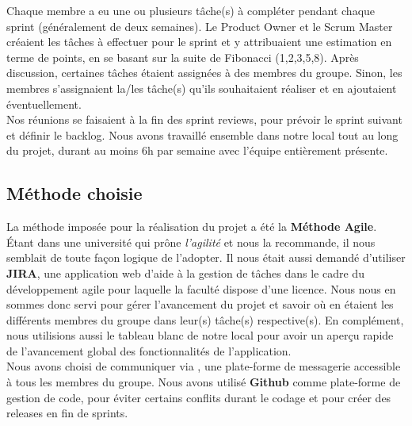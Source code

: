 \documentclass[t, 12pt, usenames,dvipsnames]{article}
\begin{document}
            \newpage
            
            \noindent Chaque membre a eu une ou plusieurs tâche(s) à compléter pendant chaque sprint (généralement de deux semaines). Le Product Owner et le Scrum Master créaient les tâches à effectuer pour le sprint et y attribuaient une estimation en terme de points, en se basant sur la suite de Fibonacci (1,2,3,5,8). Après discussion, certaines tâches étaient assignées à des membres du groupe. Sinon, les membres s'assignaient la/les tâche(s) qu'ils souhaitaient réaliser et en ajoutaient éventuellement.\\
            Nos réunions se faisaient à la fin des sprint reviews, pour prévoir le sprint suivant et définir le backlog. Nous avons travaillé ensemble dans notre local tout au long du projet, durant au moins 6h par semaine avec l'équipe entièrement présente.
            
        \subsection{Méthode choisie}
            \noindent La méthode imposée pour la réalisation du projet a été la \textbf{Méthode Agile}. Étant dans une université qui prône \textit{l'agilité} et nous la recommande, il nous semblait de toute façon logique de l'adopter. Il nous était aussi demandé d'utiliser \textbf{JIRA}, une application web d'aide à la gestion de tâches dans le cadre du développement agile pour laquelle la faculté dispose d'une licence. Nous nous en sommes donc servi pour gérer l'avancement du projet et savoir où en étaient les différents membres du groupe dans leur(s) tâche(s) respective(s). En complément, nous utilisions aussi le tableau blanc de notre local pour avoir un aperçu rapide de l'avancement global des fonctionnalités de l'application. \\
            Nous avons choisi de communiquer via , une plate-forme de messagerie accessible à tous les membres du groupe. Nous avons utilisé \textbf{Github} comme plate-forme de gestion de code, pour éviter certains conflits durant le codage et pour créer des releases en fin de sprints.\\
            
\end{document}
